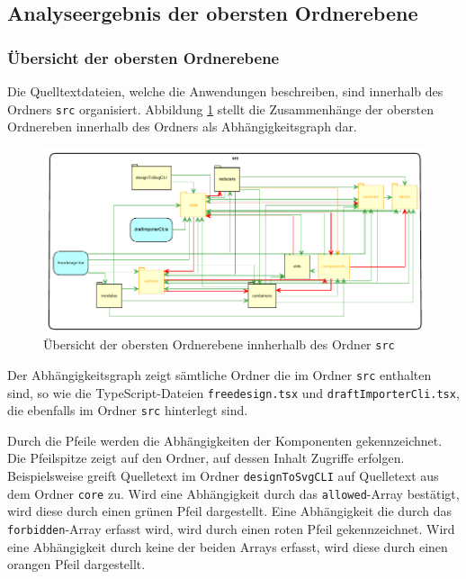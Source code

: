 \subsection{Analyseergebnis der obersten Ordnerebene}
\subsubsection{Übersicht der obersten Ordnerebene}
Die Quelltextdateien, welche die Anwendungen beschreiben, sind innerhalb des Ordners \lstinline|src| organisiert. 
Abbildung \ref{fig:obersteOrdnerebene} stellt die Zusammenhänge der obersten Ordnereben innerhalb des Ordners als Abhängigkeitsgraph dar. 
\begin{figure}[H]
	\centering
    \caption{Übersicht der obersten Ordnerebene innherhalb des Ordner \lstinline|src|}
	\label{fig:obersteOrdnerebene}
	\includegraphics{diagrams/Ist-Architektur/Projektuebersicht.pdf}
\end{figure}

Der Abhängigkeitsgraph zeigt sämtliche Ordner die im Ordner \lstinline|src| enthalten sind, so wie die TypeScript-Dateien \lstinline|freedesign.tsx| und \lstinline|draftImporterCli.tsx|, die ebenfalls im Ordner \lstinline|src| hinterlegt sind.  

Durch die Pfeile werden die Abhängigkeiten der Komponenten gekennzeichnet. Die Pfeilspitze zeigt auf den Ordner, auf dessen Inhalt Zugriffe erfolgen. Beispielsweise greift Quelletext im Ordner \lstinline|designToSvgCLI| auf Quelletext aus dem Ordner \lstinline|core| zu.
Wird eine Abhängigkeit durch das \lstinline|allowed|-Array bestätigt, wird diese durch einen grünen Pfeil dargestellt. Eine Abhängigkeit die durch das \lstinline|forbidden|-Array erfasst wird, wird durch einen roten Pfeil gekennzeichnet. Wird eine Abhängigkeit durch keine der beiden Arrays erfasst, wird diese durch einen orangen Pfeil dargestellt.


